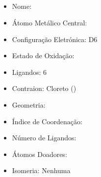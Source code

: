 \documentclass[12pt]{article}
\begin{document}
\noindent\begin{minipage}{\textwidth}
	
	\subsection{\ch{}}
	\begin{itemize}
   \item Nome:
   	
   
   \item Átomo Metálico Central:
   	
   	
   \item Configuração Eletrónica:
   	D6
   
   \item Estado de Oxidação:
   	
   
   \item Ligandos:
   	6
   
   \item Contraion:
   	Cloreto ()
   
   \item Geometria:
   	
   
   \item Índice de Coordenação: 
   
   
   \item Número de Ligandos:
   
   
   \item Átomos Doadores:
   
   
   \item Isomeria:
   	Nenhuma
   
	\end{itemize}
	
\end{minipage}
\end{document}
